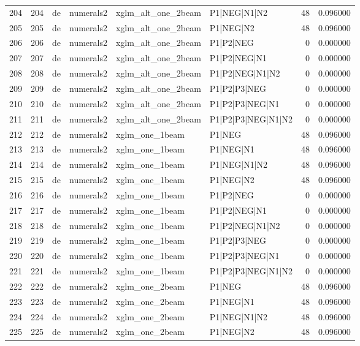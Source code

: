 \begin{tabular}{lrllllrr}
204 & 204 & de & numerals2 & xglm_alt_one_2beam & P1|NEG|N1|N2 & 48 & 0.096000 \\
205 & 205 & de & numerals2 & xglm_alt_one_2beam & P1|NEG|N2 & 48 & 0.096000 \\
206 & 206 & de & numerals2 & xglm_alt_one_2beam & P1|P2|NEG & 0 & 0.000000 \\
207 & 207 & de & numerals2 & xglm_alt_one_2beam & P1|P2|NEG|N1 & 0 & 0.000000 \\
208 & 208 & de & numerals2 & xglm_alt_one_2beam & P1|P2|NEG|N1|N2 & 0 & 0.000000 \\
209 & 209 & de & numerals2 & xglm_alt_one_2beam & P1|P2|P3|NEG & 0 & 0.000000 \\
210 & 210 & de & numerals2 & xglm_alt_one_2beam & P1|P2|P3|NEG|N1 & 0 & 0.000000 \\
211 & 211 & de & numerals2 & xglm_alt_one_2beam & P1|P2|P3|NEG|N1|N2 & 0 & 0.000000 \\
212 & 212 & de & numerals2 & xglm_one_1beam & P1|NEG & 48 & 0.096000 \\
213 & 213 & de & numerals2 & xglm_one_1beam & P1|NEG|N1 & 48 & 0.096000 \\
214 & 214 & de & numerals2 & xglm_one_1beam & P1|NEG|N1|N2 & 48 & 0.096000 \\
215 & 215 & de & numerals2 & xglm_one_1beam & P1|NEG|N2 & 48 & 0.096000 \\
216 & 216 & de & numerals2 & xglm_one_1beam & P1|P2|NEG & 0 & 0.000000 \\
217 & 217 & de & numerals2 & xglm_one_1beam & P1|P2|NEG|N1 & 0 & 0.000000 \\
218 & 218 & de & numerals2 & xglm_one_1beam & P1|P2|NEG|N1|N2 & 0 & 0.000000 \\
219 & 219 & de & numerals2 & xglm_one_1beam & P1|P2|P3|NEG & 0 & 0.000000 \\
220 & 220 & de & numerals2 & xglm_one_1beam & P1|P2|P3|NEG|N1 & 0 & 0.000000 \\
221 & 221 & de & numerals2 & xglm_one_1beam & P1|P2|P3|NEG|N1|N2 & 0 & 0.000000 \\
222 & 222 & de & numerals2 & xglm_one_2beam & P1|NEG & 48 & 0.096000 \\
223 & 223 & de & numerals2 & xglm_one_2beam & P1|NEG|N1 & 48 & 0.096000 \\
224 & 224 & de & numerals2 & xglm_one_2beam & P1|NEG|N1|N2 & 48 & 0.096000 \\
225 & 225 & de & numerals2 & xglm_one_2beam & P1|NEG|N2 & 48 & 0.096000 \\

\end{tabular}
